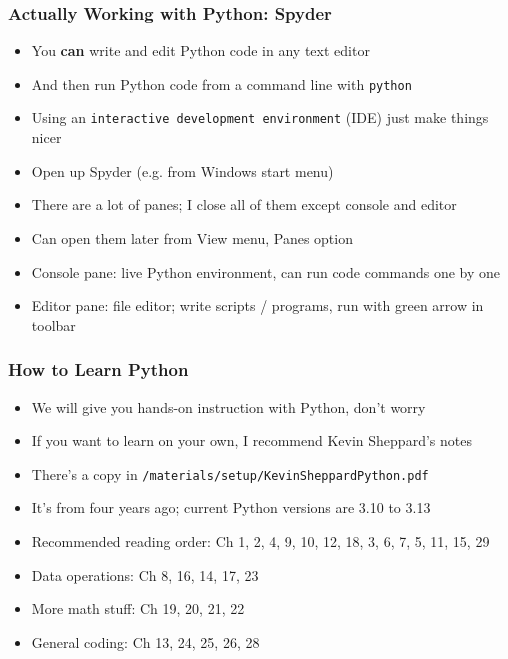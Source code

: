 \documentclass[aspectratio=169]{beamer}
\begin{document}

\begin{frame}
\frametitle{Actually Working with Python: Spyder}
\begin{itemize}
	\item You \textbf{can} write and edit Python code in any text editor
	
	\item And then run Python code from a command line with \texttt{python}
	
	\item <2->Using an \texttt{interactive development environment} (IDE) just make things nicer
	
	\item <2->Open up Spyder (e.g. from Windows start menu)
	
	\item <3->There are a lot of panes; I close all of them except console and editor
	
	\item <3->Can open them later from View menu, Panes option
	
	\item <4->Console pane: live Python environment, can run code commands one by one
	
	\item <4->Editor pane: file editor; write scripts / programs, run with green arrow in toolbar
\end{itemize}
\end{frame}

\begin{frame}
\frametitle{How to Learn Python}
\begin{itemize}
	\item We will give you hands-on instruction with Python, don't worry
	
	\item If you want to learn on your own, I recommend Kevin Sheppard's notes
	
	\item There's a copy in \texttt{/materials/setup/KevinSheppardPython.pdf}
	
	\item It's from four years ago; current Python versions are 3.10 to 3.13
	
	\item <2->Recommended reading order: Ch 1, 2, 4, 9, 10, 12, 18, 3, 6, 7, 5, 11, 15, 29
	
	\item <2->Data operations: Ch 8, 16, 14, 17, 23
	
	\item <2->More math stuff: Ch 19, 20, 21, 22
	
	\item <2->General coding: Ch 13, 24, 25, 26, 28
\end{itemize}

\end{frame}
\end{document}

